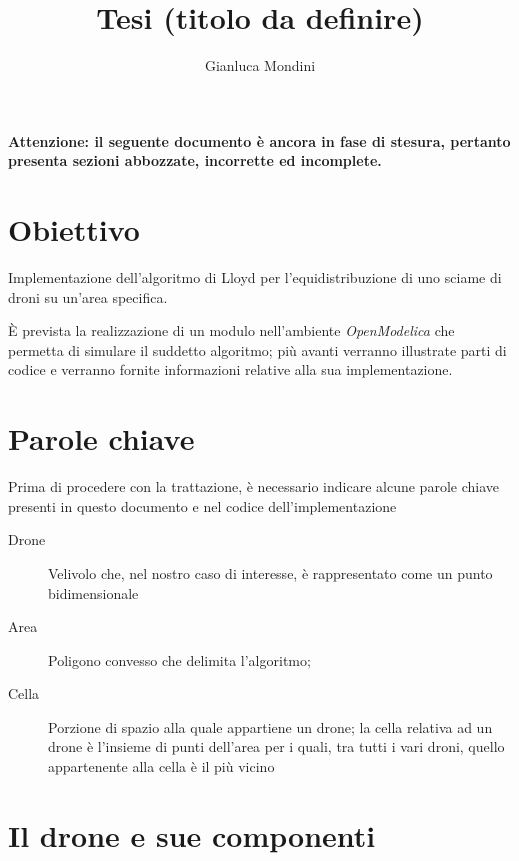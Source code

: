 \documentclass[10pt,a4paper]{article}
\author{Gianluca Mondini}
\title{Tesi (titolo da definire)}
\begin{document}
\begin{center}
\textbf{Attenzione: il seguente documento è ancora in fase di stesura, pertanto presenta sezioni abbozzate, incorrette ed incomplete.}
\end{center}

\maketitle

\pagebreak

\tableofcontents

\pagebreak


\section{Obiettivo}

Implementazione dell'algoritmo di Lloyd per l'equidistribuzione di uno sciame di droni su un'area specifica.

È prevista la realizzazione di un modulo nell'ambiente \textit{OpenModelica} che permetta di simulare il suddetto algoritmo; più avanti verranno illustrate parti di codice e verranno fornite informazioni relative alla sua implementazione.

\pagebreak

\section{Parole chiave}

Prima di procedere con la trattazione, è necessario indicare alcune parole chiave presenti in questo documento e nel codice dell'implementazione

\begin{description}
	\item[Drone] Velivolo che, nel nostro caso di interesse, è rappresentato come un punto bidimensionale
	\item[Area] Poligono convesso che delimita l'algoritmo;
	\item[Cella] Porzione di spazio alla quale appartiene un drone; la cella relativa ad un drone è l'insieme di punti dell'area per i quali, tra tutti i vari droni, quello appartenente alla cella è il più vicino
\end{description}

\pagebreak

\section{Il drone e sue componenti}
\end{document}
